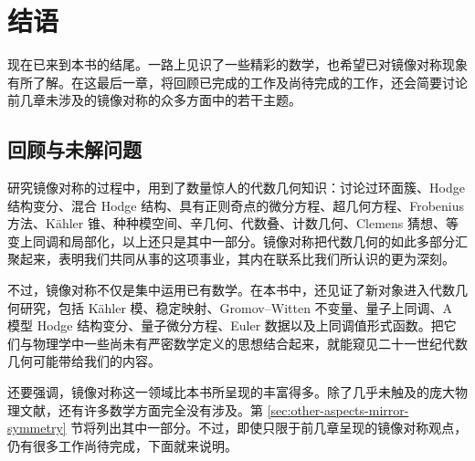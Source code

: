 \chapter{结语}\label{chap:conclusion}
现在已来到本书的结尾。一路上见识了一些精彩的数学，也希望已对镜像对称现象有所了解。在这最后一章，将回顾已完成的工作及尚待完成的工作，还会简要讨论前几章未涉及的镜像对称的众多方面中的若干主题。

\section{回顾与未解问题}\label{sec:reflections-open-problems}
研究镜像对称的过程中，用到了数量惊人的代数几何知识：讨论过环面簇、Hodge 结构变分、混合 Hodge 结构、具有正则奇点的微分方程、超几何方程、Frobenius 方法、Kähler 锥、种种模空间、辛几何、代数叠、计数几何、Clemens 猜想、等变上同调和局部化，以上还只是其中一部分。镜像对称把代数几何的如此多部分汇聚起来，表明我们共同从事的这项事业，其内在联系比我们所认识的更为深刻。

不过，镜像对称不仅是集中运用已有数学。在本书中，还见证了新对象进入代数几何研究，包括 Kähler 模、稳定映射、Gromov--Witten 不变量、量子上同调、A 模型 Hodge 结构变分、量子微分方程、Euler 数据以及上同调值形式函数。把它们与物理学中一些尚未有严密数学定义的思想结合起来，就能窥见二十一世纪代数几何可能带给我们的内容。

还要强调，镜像对称这一领域比本书所呈现的丰富得多。除了几乎未触及的庞大物理文献，还有许多数学方面完全没有涉及。第 \hyperref[sec:other-aspects-mirror-symmetry]{\ref*{sec:other-aspects-mirror-symmetry}} 节将列出其中一部分。不过，即使只限于前几章呈现的镜像对称观点，仍有很多工作尚待完成，下面就来说明。

